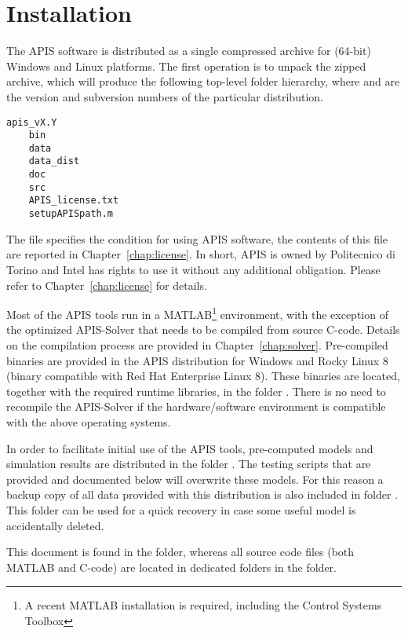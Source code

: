 \section{Installation}\label{sec:installation}

The APIS software is distributed as a single compressed archive for (64-bit) Windows and Linux platforms. The first operation is to unpack the zipped archive, which will produce the following top-level folder hierarchy, where  and  are the version and subversion numbers of the particular distribution.
\begin{lstlisting}[numbers=none]
apis_vX.Y
    bin
    data
    data_dist
    doc
    src
    APIS_license.txt
    setupAPISpath.m
\end{lstlisting}
The file  specifies the condition for using APIS software, the contents of this file are reported in Chapter~\ref{chap:license}. In short, APIS is owned by Politecnico di Torino and Intel has rights to use it without any additional obligation. Please refer to Chapter~\ref{chap:license} for details.

Most of the APIS tools run in a MATLAB\footnote{A recent MATLAB installation is required, including the Control Systems Toolbox} environment, with the exception of the optimized APIS-Solver that needs to be compiled from source C-code. Details on the compilation process are provided in Chapter~\ref{chap:solver}. Pre-compiled binaries are provided in the APIS distribution for Windows and Rocky Linux 8 (binary compatible with Red Hat Enterprise Linux 8). These binaries are located, together with the required runtime libraries, in the folder . There is no need to recompile the APIS-Solver if the hardware/software environment is compatible with the above operating systems.

In order to facilitate initial use of the APIS tools, pre-computed models and simulation results are distributed in the folder . The testing scripts that are provided and documented below will overwrite these models. For this reason a backup copy of all data provided with this distribution is also included in folder . This folder can be used for a quick recovery in case some useful model is accidentally deleted.

This document is found in the  folder, whereas all source code files (both MATLAB and C-code) are located in dedicated folders in the  folder.


